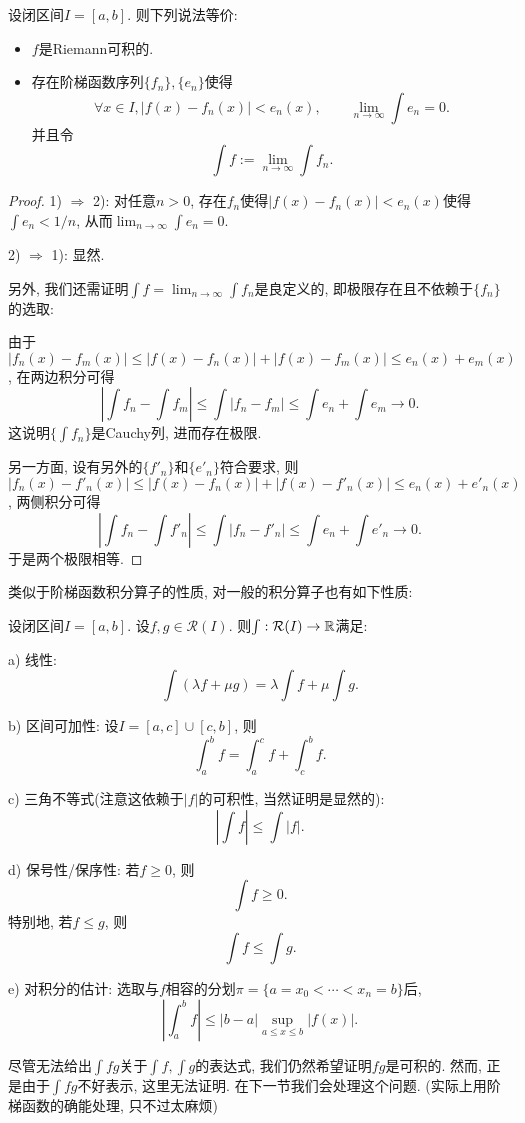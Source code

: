 \begin{proposition}{}
	设闭区间$I=[a,b]$. 则下列说法等价: 
	\begin{itemize}
		\item $f$是Riemann可积的. 
		\item 存在阶梯函数序列$\{ f_n \},\{ e_n \}$使得$$\forall x \in I,|f(x)-f_n(x)|<e_n(x),\qquad \lim_{n\to \infty} \int e_n = 0.$$
		并且令$$\int f := \lim_{n\to \infty} \int f_n .$$
	\end{itemize}
\end{proposition}
\begin{proof}
	1) $\Rightarrow$ 2): 对任意$n>0$, 存在$f_n$使得$|f(x)-f_n(x)|<e_n(x)$使得$\int e_n < 1/n$, 从而$\lim_{n\to \infty} \int e_n = 0$. 

	2) $\Rightarrow$ 1): 显然. 

	另外, 我们还需证明$\int f = \lim_{n\to \infty} \int f_n$是良定义的, 即极限存在且不依赖于$\{ f_n \}$的选取: 

	由于$|f_n(x)-f_m(x)| \leq |f(x)-f_n(x)| + |f(x)-f_m(x)| \leq e_n(x)+e_m(x)$, 在两边积分可得$$\left| \int f_n-\int f_m \right| \leq \int |f_n-f_m| \leq \int e_n + \int e_m \to 0.$$
	这说明$\{ \int f_n \}$是Cauchy列, 进而存在极限. 

	另一方面, 设有另外的$\{ f'_n \}$和$\{ e'_n \}$符合要求, 则$|f_n(x)-f'_n(x)| \leq |f(x)-f_n(x)| + |f(x)-f'_n(x)| \leq e_n(x)+e'_n(x)$, 两侧积分可得$$\left| \int f_n - \int f'_n \right| \leq \int |f_n-f'_n| \leq \int e_n+ \int e'_n \to 0.$$
	于是两个极限相等. 
\end{proof}


类似于阶梯函数积分算子的性质, 对一般的积分算子也有如下性质: 

\begin{proposition}{} \label{pro:jiffxkvi1}
	设闭区间$I=[a,b]$. 设$f,g \in \mathcal{R}(I)$. 则$\int : \mathcal{R}(I) \to \mathbb{R}$满足: 
	
	a) 线性: $$\int (\lambda f+ \mu g) = \lambda \int f + \mu \int g.$$
	
	b) 区间可加性: 设$I=[a,c] \cup [c,b]$, 则$$\int_a^b f = \int_a^c f + \int_c^b f. $$
	
	c) 三角不等式(注意这依赖于$|f|$的可积性, 当然证明是显然的): $$\left| \int f \right| \leq \int |f|. $$
	
	d) 保号性/保序性: 若$f \geq 0$, 则$$\int f \geq 0. $$
	\qquad 特别地, 若$f \leq g$, 则$$ \int f \leq  \int g.$$
	
	e) 对积分的估计: 选取与$f$相容的分划$\pi= \{ a=x_0<\cdots <x_n=b \}$后, $$\left| \int_a^b f \right| \leq |b-a| \sup_{a \leq x \leq b} |f(x)|. $$
\end{proposition}
\begin{remark}
	尽管无法给出$\int fg$关于$\int f,\int g$的表达式, 我们仍然希望证明$fg$是可积的. 然而, 正是由于$\int fg$不好表示, 这里无法证明. 在下一节我们会处理这个问题. (实际上用阶梯函数的确能处理, 只不过太麻烦)
\end{remark}

